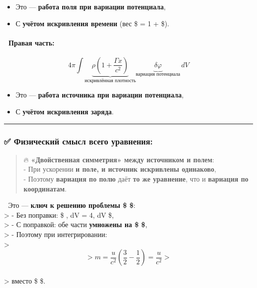 \documentclass[11pt]{article}
\providecommand{\tightlist}{%
      \setlength{\itemsep}{0pt}\setlength{\parskip}{0pt}}
\begin{document}
\begin{itemize}
\tightlist
\item
  Это --- \textbf{работа поля при вариации потенциала},\\
\item
  С \textbf{учётом искривления времени} (вес \$  = 1 +
   \$).
\end{itemize}

\paragraph{🔹 Правая
часть:}\label{ux43fux440ux430ux432ux430ux44f-ux447ux430ux441ux442ux44c}

\[
4\pi \int \underbrace{\rho \left( 1 + \frac{\Gamma x}{c^2} \right)}_{\text{искривлённая плотность}} \underbrace{\delta \varphi}_{\text{вариация потенциала}} \, dV
\]

\begin{itemize}
\tightlist
\item
  Это --- \textbf{работа источника при вариации потенциала},\\
\item
  С \textbf{учётом искривления заряда}.
\end{itemize}

\begin{center}\rule{0.5\linewidth}{\linethickness}\end{center}

\subsubsection{✅ Физический смысл всего
уравнения:}\label{ux444ux438ux437ux438ux447ux435ux441ux43aux438ux439-ux441ux43cux44bux441ux43b-ux432ux441ux435ux433ux43e-ux443ux440ux430ux432ux43dux435ux43dux438ux44f}

\begin{quote}
🔥 \textbf{«Двойственная симметрия» между источником и полем}:\\
- При ускорении \textbf{и поле, и источник искривлены одинаково},\\
- Поэтому \textbf{вариация по полю} даёт \textbf{то же уравнение}, что и
\textbf{вариация по координатам}.
\end{quote}

📌 Это --- \textbf{ключ к решению проблемы \$  \$}:\\
\textgreater{} - Без поправки: \$ \int {}
\cdot \nabla \delta \varphi , dV = 4\pi \int \rho \delta \varphi , dV
\$,\\
\textgreater{} - С поправкой: обе части \textbf{умножены на \$
 \$},\\
\textgreater{} - Поэтому при интегрировании:\\
\textgreater{} \[
>   m = \frac{u}{c^2} \left( \frac{3}{2} - \frac{1}{2} \right) = \frac{u}{c^2}
>   \]\\
\textgreater{} вместо \$   \$.
\end{document}
